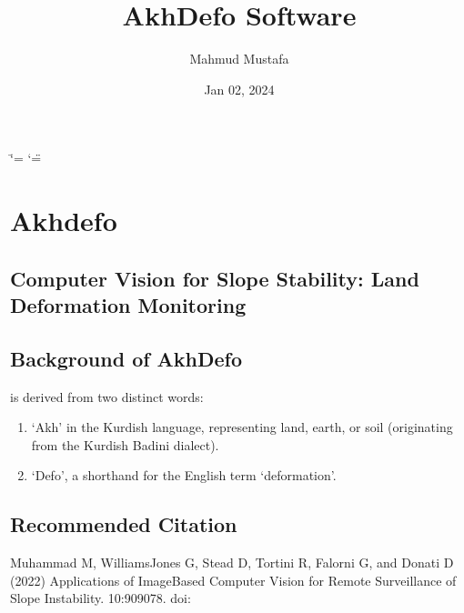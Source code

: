 \documentclass[letterpaper,10pt,english]{sphinxmanual}
\title{AkhDefo Software}
\date{Jan 02, 2024}
\author{Mahmud Mustafa}
\let\sphinxpxdimen\pdfpxdimen\else\newdimen\sphinxpxdimen
\begin{document}
\ifdefined\shorthandoff
  \ifnum\catcode`\=\string=\active\shorthandoff{=}\fi
  \ifnum\catcode`\"=\active{}\fi
\fi

\pagestyle{empty}
\sphinxmaketitle
\pagestyle{plain}
\sphinxtableofcontents
\pagestyle{normal}
\label{\detokenize{index::doc}}


\noindent{\hspace*{\fill}\sphinxincludegraphics[width=200\sphinxpxdimen]{{akhdefo_logo}.svg}}

\sphinxstepscope


\chapter{Akhdefo}
\label{\detokenize{README:akhdefo}}\label{\detokenize{README::doc}}



\section{Computer Vision for Slope Stability: Land Deformation Monitoring}
\label{\detokenize{README:computer-vision-for-slope-stability-land-deformation-monitoring}}

\section{Background of Akh\sphinxhyphen{}Defo}
\label{\detokenize{README:background-of-akh-defo}}
\sphinxAtStartPar
{} is derived from two distinct words:
\begin{enumerate}
%
\item {} 
\sphinxAtStartPar
‘Akh’ in the Kurdish language, representing land, earth, or soil (originating from the Kurdish Badini dialect).

\item {} 
\sphinxAtStartPar
‘Defo’, a shorthand for the English term ‘deformation’.

\end{enumerate}


\section{Recommended Citation}
\label{\detokenize{README:recommended-citation}}
\sphinxAtStartPar
Muhammad M, Williams\sphinxhyphen{}Jones G, Stead D, Tortini R, Falorni G, and Donati D (2022) Applications of Image\sphinxhyphen{}Based Computer Vision for Remote Surveillance of Slope Instability.  10:909078. doi: 
\end{document}
